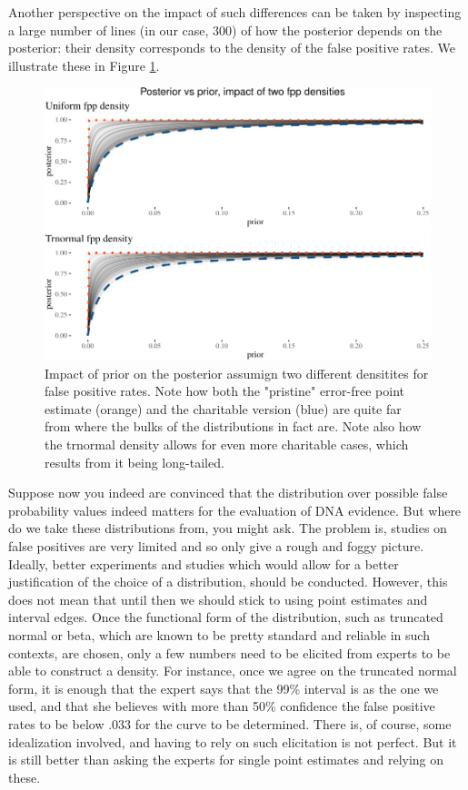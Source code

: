 \documentclass[
  10pt,
  dvipsnames,enabledeprecatedfontcommands]{scrartcl}
\begin{document}
Another perspective on the impact of such differences can be taken by
inspecting a large number of lines (in our case, 300) of how the
posterior depends on the posterior: their density corresponds to the
density of the false positive rates. We illustrate these in Figure
\ref{fig:fplinesPlot}.

\begin{figure}[H]

\begin{center}\includegraphics[width=0.8\linewidth]{chapter-outline_files/figure-latex/fig:fplinesPlot2-1} \end{center}
\caption{Impact of prior on the posterior assumign two different densitites for false positive rates. Note how both the "pristine" error-free point estimate (orange) and the charitable version (blue) are quite far from where the bulks of the distributions in fact are. Note also how the trnormal density allows for even more charitable cases, which results from it being long-tailed.}
\label{fig:fplinesPlot}
\end{figure}

Suppose now you indeed are convinced that the distribution over possible
false probability values indeed matters for the evaluation of DNA
evidence. But where do we take these distributions from, you might ask.
The problem is, studies on false positives are very limited and so only
give a rough and foggy picture. Ideally, better experiments and studies
which would allow for a better justification of the choice of a
distribution, should be conducted. However, this does not mean that
until then we should stick to using point estimates and interval edges.
Once the functional form of the distribution, such as truncated normal
or beta, which are known to be pretty standard and reliable in such
contexts, are chosen, only a few numbers need to be elicited from
experts to be able to construct a density. For instance, once we agree
on the truncated normal form, it is enough that the expert says that the
99\% interval is as the one we used, and that she believes with more
than 50\% confidence the false positive rates to be below \(.033\) for
the curve to be determined. There is, of course, some idealization
involved, and having to rely on such elicitation is not perfect. But it
is still better than asking the experts for single point estimates and
relying on these.
\end{document}
